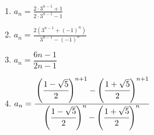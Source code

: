     \noindent{}\par\nobreak
    \begin{enumerate}[label=(\arabic*),parsep=3pt,format=\bookitemlink{example-mobius-1}{answer}{problem}]
      \item $\displaystyle a_n=\frac{2\cdot3^{n-1}+1}{2\cdot3^{n-1}-1}$
      \item $\displaystyle a_n=\frac{2\left(3^{n-1}+(-1)^n\right)}{3^{n-1}-(-1)^n}$
      \item $a_{n}=\dfrac{6n-1}{2n-1}$
      \item $\displaystyle a_n=\cfrac{\left(\cfrac{1-\sqrt{5}}{2}\right)^{n+1}-\left(\cfrac{1+\sqrt{5}}{2}\right)^{n+1}}{\left(\cfrac{1-\sqrt{5}}{2}\right)^n-\left(\cfrac{1+\sqrt{5}}{2}\right)^n}$
    \end{enumerate}

